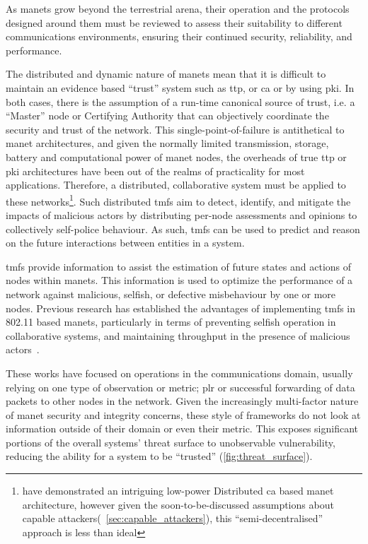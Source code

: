 As \glspl{manet} grow beyond the terrestrial arena, their operation and the protocols designed around them must be reviewed to assess their suitability to different communications environments, ensuring their continued security, reliability, and performance.

The distributed and dynamic nature of \glspl{manet} mean that it is difficult to maintain an evidence based ``trust'' system such as \gls{ttp}, or \gls{ca} or by using \gls{pki}. 
In both cases, there is the assumption of a run-time canonical source of trust, i.e. a ``Master'' node or Certifying Authority that can objectively coordinate the security and trust of the network.
This single-point-of-failure is antithetical to \gls{manet} architectures, and given the normally limited transmission, storage, battery and computational power of \gls{manet} nodes, the overheads of true \gls{ttp} or \gls{pki} architectures have been out of the realms of practicality for most applications.
Therefore, a distributed, collaborative system must be applied to these networks\footnote{\citet{Zouridaki} have demonstrated an intriguing low-power Distributed \gls{ca} based \gls{manet} architecture, however given the soon-to-be-discussed assumptions about capable attackers(~\autoref{sec:capable_attackers}), this ``semi-decentralised'' approach is less than ideal}.
Such distributed \glspl{tmf} aim to detect, identify, and mitigate the impacts of malicious actors by distributing per-node assessments and opinions to collectively self-police behaviour.
As such, \glspl{tmf} can be used to predict and reason on the future interactions between entities in a system.

\glspl{tmf} provide information to assist the estimation of future states and actions of nodes within \glspl{manet}.
This information is used to optimize the performance of a network against malicious, selfish, or defective misbehaviour by one or more nodes.
Previous research has established the advantages of implementing \glspl{tmf} in 802.11 based \glspl{manet}, particularly in terms of preventing selfish operation in collaborative systems, and maintaining throughput in the presence of malicious actors~\cite{Li2007, Buchegger2002}.

These works have focused on operations in the communications domain, usually relying on one type of observation or metric; \gls{plr} or successful forwarding of data packets to other nodes in the network.
Given the increasingly multi-factor nature of \gls{manet} security and integrity concerns, these style of frameworks do not look at information outside of their domain or even their metric. 
This exposes significant portions of the overall systems' threat surface to unobservable vulnerability, reducing the ability for a system to be ``trusted'' (\autoref{fig:threat_surface}).

